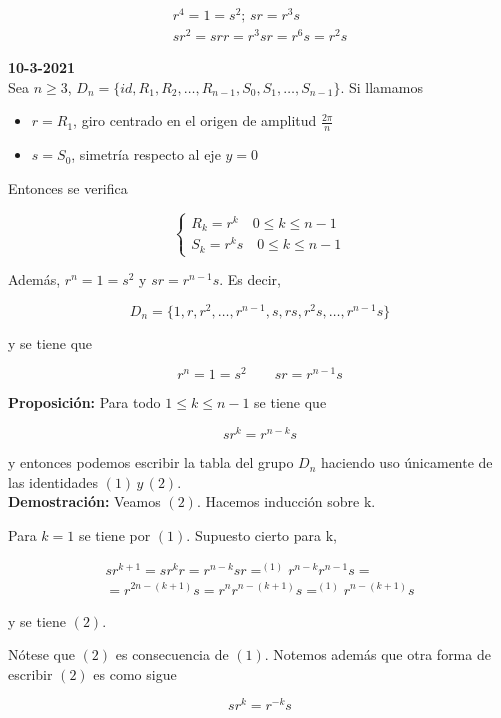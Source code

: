 \documentclass{article}
\begin{document}
\begin{gather*}
r^4=1=s^2;\, sr=r^3s \\
sr^2=srr=r^3sr=r^6s=r^2s
\end{gather*}

\textbf{10-3-2021} \\

Sea $n\geq 3$, $D_n=\{id,R_1,R_2,\ldots,R_{n-1},S_0,S_1,\ldots,S_{n-1}\}$. Si llamamos 

\begin{itemize}
\item $r=R_1$, giro centrado en el origen de amplitud $\frac{2\pi}{n}$
\item $s=S_0$, simetría respecto al eje $y=0$
\end{itemize}

Entonces se verifica

\[
\left\lbrace \begin{array}{c}
R_k=r^k \quad 0\leq k \leq n-1 \\
S_k=r^ks \quad 0 \leq k \leq n-1
\end{array} \right.
\]

Además, $r^n=1=s^2$ y $sr=r^{n-1}s$. Es decir,

\[
D_n=\{1,r,r^2,\ldots,r^{n-1},s,rs,r^2s,\ldots,r^{n-1}s\}
\]

y se tiene que 

\[
r^n=1=s^2 \qquad sr=r^{n-1}s \tag{1}
\]

\textbf{Proposición:} Para todo $1 \leq k \leq n-1$ se tiene que

\[
sr^k=r^{n-k}s \tag{2}
\]

y entonces podemos escribir la tabla del grupo $D_n$ haciendo uso únicamente de las identidades $(1)\,y\,(2)$. \\

\textbf{Demostración:} Veamos $(2)$. Hacemos inducción sobre k.

Para $k=1$ se tiene por $(1)$. Supuesto cierto para k,

\begin{gather*}
sr^{k+1}=sr^kr=r^{n-k}sr=^{(1)}r^{n-k}r^{n-1}s= \\
=r^{2n-(k+1)}s=r^nr^{n-(k+1)}s=^{(1)}r^{n-(k+1)}s
\end{gather*}

y se tiene $(2)$.

Nótese que $(2)$ es consecuencia de $(1)$. Notemos además que otra forma de escribir $(2)$ es como sigue

\[
sr^k=r^{-k}s \tag{2'}
\]
\end{document}
